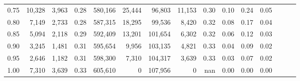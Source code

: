 \begin{tabular}{rrrrrrrrrrrrrrr}
0.75 &  10,328 &  3,963 &  0.28 &  580,166 &   25,444 &   96,803 &   11,153 &  0.30 &  0.10 &  0.24 &      0.05 \\
0.80 &   7,149 &  2,733 &  0.28 &  587,315 &   18,295 &   99,536 &    8,420 &  0.32 &  0.08 &  0.17 &      0.04 \\
0.85 &   5,094 &  2,118 &  0.29 &  592,409 &   13,201 &  101,654 &    6,302 &  0.32 &  0.06 &  0.12 &      0.03 \\
0.90 &   3,245 &  1,481 &  0.31 &  595,654 &    9,956 &  103,135 &    4,821 &  0.33 &  0.04 &  0.09 &      0.02 \\
0.95 &   2,646 &  1,182 &  0.31 &  598,300 &    7,310 &  104,317 &    3,639 &  0.33 &  0.03 &  0.07 &      0.02 \\
1.00 &   7,310 &  3,639 &  0.33 &  605,610 &        0 &  107,956 &        0 &   nan &  0.00 &  0.00 &      0.00 \\
\bottomrule
\end{tabular}
